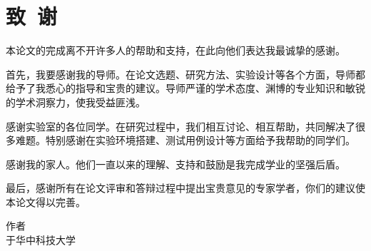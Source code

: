\chapter*{致\ 谢}

本论文的完成离不开许多人的帮助和支持，在此向他们表达我最诚挚的感谢。

首先，我要感谢我的导师。在论文选题、研究方法、实验设计等各个方面，导师都给予了我悉心的指导和宝贵的建议。导师严谨的学术态度、渊博的专业知识和敏锐的学术洞察力，使我受益匪浅。

感谢实验室的各位同学。在研究过程中，我们相互讨论、相互帮助，共同解决了很多难题。特别感谢在实验环境搭建、测试用例设计等方面给予我帮助的同学们。

感谢我的家人。他们一直以来的理解、支持和鼓励是我完成学业的坚强后盾。

最后，感谢所有在论文评审和答辩过程中提出宝贵意见的专家学者，你们的建议使本论文得以完善。

\begin{flushright}
作者 \\
于华中科技大学
\end{flushright}
